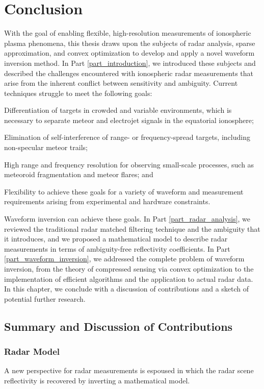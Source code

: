 \chapter{Conclusion}
\label{conclusion}
With the goal of enabling flexible, high-resolution measurements of ionospheric plasma phenomena, this thesis draws upon the subjects of radar analysis, sparse approximation, and convex optimization to develop and apply a novel waveform inversion method. In Part \ref{part_introduction}, we introduced these subjects and described the challenges encountered with ionospheric radar measurements that arise from the inherent conflict between sensitivity and ambiguity. Current techniques struggle to meet the following goals:
\begin{inparaenum}[1)]
 \item Differentiation of targets in crowded and variable environments, which is necessary to separate meteor and electrojet signals in the equatorial ionosphere;
 \item Elimination of self-interference of range- or frequency-spread targets, including non-specular meteor trails;
 \item High range and frequency resolution for observing small-scale processes, such as meteoroid fragmentation and meteor flares; and
 \item Flexibility to achieve these goals for a variety of waveform and measurement requirements arising from experimental and hardware constraints.
\end{inparaenum}
Waveform inversion can achieve these goals. In Part \ref{part_radar_analysis}, we reviewed the traditional radar matched filtering technique and the ambiguity that it introduces, and we proposed a mathematical model to describe radar measurements in terms of ambiguity-free reflectivity coefficients. In Part \ref{part_waveform_inversion}, we addressed the complete problem of waveform inversion, from the theory of compressed sensing via convex optimization to the implementation of efficient algorithms and the application to actual radar data. In this chapter, we conclude with a discussion of contributions and a sketch of potential further research.

\section{Summary and Discussion of Contributions}
\label{discussion}
\subsection{Radar Model}
\begin{italicquote}
A new perspective for radar measurements is espoused in which the radar scene reflectivity is recovered by inverting a mathematical model.
\end{italicquote}

